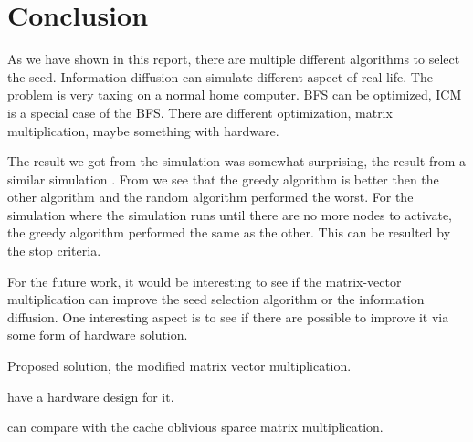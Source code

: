 \chapter{Conclusion}
As we have shown in this report, there are multiple different algorithms to select the seed. Information diffusion can simulate different aspect of real life. The problem is very taxing on a normal home computer. BFS can be optimized, ICM is a special case of the BFS. There are different optimization, matrix multiplication, maybe something with hardware. 

The result we got from the simulation was somewhat surprising, the result from a similar simulation \cite{MaximizeSpread2003}. From \cite{MaximizeSpread2003} we see that the greedy algorithm is better then the other algorithm and the random algorithm performed the worst. For the simulation where the simulation runs until there are no more nodes to activate, the greedy algorithm performed the same as the other. This can be resulted by the stop criteria.

For the future work, it would be interesting to see if the matrix-vector multiplication can improve the seed selection algorithm or the information diffusion. One interesting aspect is to see if there are possible to improve it via some form of hardware solution.

Proposed solution, the modified matrix vector multiplication.

have a hardware design for it.

can compare with the cache oblivious sparce matrix multiplication.